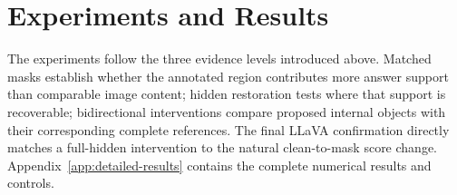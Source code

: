 \section{Experiments and Results}
\label{sec:experiments-results}

The experiments follow the three evidence levels introduced above. Matched masks establish whether the annotated region contributes more answer support than comparable image content; hidden restoration tests where that support is recoverable; bidirectional interventions compare proposed internal objects with their corresponding complete references. The final LLaVA confirmation directly matches a full-hidden intervention to the natural clean-to-mask score change. Appendix~\ref{app:detailed-results} contains the complete numerical results and controls.


